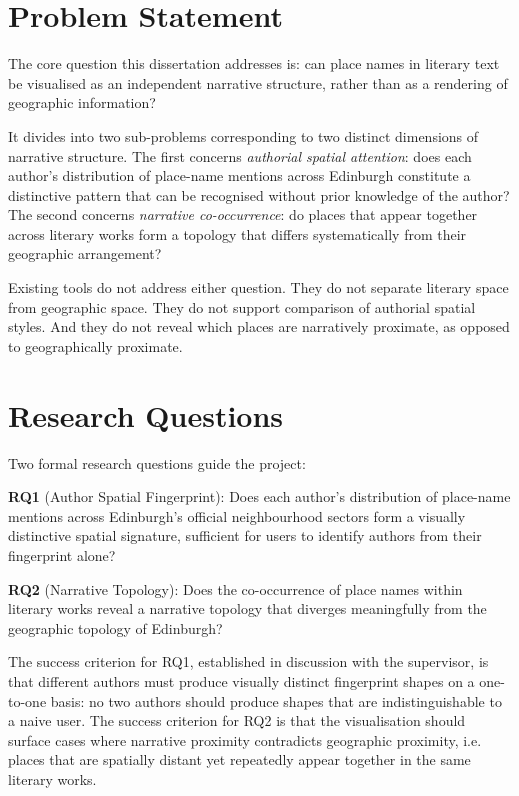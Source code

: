 \documentclass[logo,msc]{infthesis}
\begin{document}
\section{Problem Statement}
 
The core question this dissertation addresses is: can place names in literary text be visualised as an independent narrative structure, rather than as a rendering of geographic information?
 
It divides into two sub-problems corresponding to two distinct dimensions of narrative structure. The first concerns \emph{authorial spatial attention}: does each author's distribution of place-name mentions across Edinburgh constitute a distinctive pattern that can be recognised without prior knowledge of the author? The second concerns \emph{narrative co-occurrence}: do places that appear together across literary works form a topology that differs systematically from their geographic arrangement?
 
Existing tools do not address either question. They do not separate literary space from geographic space. They do not support comparison of authorial spatial styles. And they do not reveal which places are narratively proximate, as opposed to geographically proximate.
 
\section{Research Questions}
 
Two formal research questions guide the project:
 
\textbf{RQ1} (Author Spatial Fingerprint): Does each author's distribution of place-name mentions across Edinburgh's official neighbourhood sectors form a visually distinctive spatial signature, sufficient for users to identify authors from their fingerprint alone?
 
\textbf{RQ2} (Narrative Topology): Does the co-occurrence of place names within literary works reveal a narrative topology that diverges meaningfully from the geographic topology of Edinburgh?
 
The success criterion for RQ1, established in discussion with the supervisor, is that different authors must produce visually distinct fingerprint shapes on a one-to-one basis: no two authors should produce shapes that are indistinguishable to a naive user. The success criterion for RQ2 is that the visualisation should surface cases where narrative proximity contradicts geographic proximity, i.e. places that are spatially distant yet repeatedly appear together in the same literary works.
 
\end{document}

